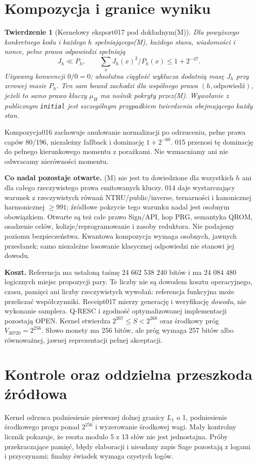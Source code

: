 \documentclass[11pt,a4paper]{article}
\newcommand{\code}[1]{\nolinkurl{#1}}
\newtheorem{theorem}{Twierdzenie}
\begin{document}
\section{Kompozycja i granice wyniku}
\begin{theorem}[Kernelowy eksport017 pod dokładnym(M)]
Dla powyższego konkretnego kodu i każdego $h$ spełniającego(M), każdego
stanu, wiadomości i nonce, pełne prawa odpowiedzi spełniają
\[
 J_h\ll P_h,\qquad \sum_x J_h(x)^2/P_h(x)\le1+2^{-47}.
\]
Używamy konwencji $0/0=0$; absolutna ciągłość wyklucza dodatnią masę
$J_h$ przy zerowej masie $P_h$. Ten sam bound zachodzi dla wspólnego prawa
$(h,\text{odpowiedź})$, jeżeli \emph{to samo} prawo kluczy $\mu_H$ ma
nośnik pokryty przez(M). Wywołanie z publicznym \code{initial} jest
szczególnym przypadkiem twierdzenia obejmującego każdy stan.
\end{theorem}
Kompozycja016 zachowuje anulowanie normalizacji po odrzuceniu, pełne prawa
capów 80/196, niezależny fallback i dominację $1+2^{-60}$.
015 przenosi tę dominację do pełnego kierunkowego momentu z porażkami.
Nie wzmacniamy ani nie odwracamy nierówności momentu.

\textbf{Co nadal pozostaje otwarte.} (M) nie jest tu dowiedzione dla
wszystkich $h$ ani dla całego rzeczywistego prawa emitowanych kluczy.
014 daje wystarczający warunek z rzeczywistych równań NTRU/public/inverse,
ternarności i kanonicznej harmonicznej $\ge991$; źródłowe pokrycie tego
warunku nadal jest osobnym obowiązkiem. Otwarte są też całe prawo Sign/API,
hop PRG, semantyka QROM, osadzenie celów, kolizje/reprogramowanie i zasoby
reduktora. Nie podajemy poziomu bezpieczeństwa.
Kwantowa kompozycja wymaga osobnych, jawnych przesłanek; samo niezależne
losowanie klasycznej odpowiedzi nie stanowi jej dowodu.

\textbf{Koszt.} Referencja ma ustaloną taśmę 24 662 538 240 bitów i ma
24 084 480 logicznych miejsc propozycji pary. Te liczby nie są dowodem kosztu
operacyjnego, czasu, pamięci ani liczby rzeczywistych wywołań: referencja
funkcyjna może przeliczać współczynniki. Receipt017 mierzy generację i
weryfikację \emph{dowodu}, nie wykonanie samplera. Q-RESC i zgodność
optymalizowanej implementacji pozostają OPEN.
Kernel stwierdza $2^{267}\le S<2^{268}$ oraz środkowy próg
$V_{30720}=2^{256}$. Słowo monety ma 256 bitów, ale próg wymaga 257 bitów
albo równoważnej, jawnej reprezentacji pełnej akceptacji.

\section{Kontrole oraz oddzielna przeszkoda źródłowa}
Kernel odrzuca podniesienie pierwszej dolnej granicy $L_1$ o 1, podniesienie
środkowego progu ponad $2^{256}$ i wyzerowanie środkowej wagi.
Mały kontrolny licznik pokazuje, że reszta modulo 5 z 13 słów nie jest
jednostajna. Próby przekraczające pamięć, błędy elaboracji i nieudany zapis
Sage pozostają z logami i przyczynami; finalny świadek wymaga czystych logów.
\end{document}
